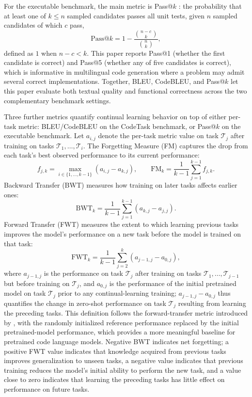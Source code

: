 For the executable benchmark, the main metric is Pass@$k$ \citep{chen2021evaluating}: the probability that at least one of $k\leq n$ sampled candidates passes all unit tests, given $n$ sampled candidates of which $c$ pass,
\begin{equation}
\mathrm{Pass@}k = 1 - \frac{\binom{n-c}{k}}{\binom{n}{k}},
\label{eq:passk}
\end{equation}
defined as $1$ when $n-c<k$. This paper reports Pass@1 (whether the first candidate is correct) and Pass@5 (whether any of five candidates is correct), which is informative in multilingual code generation where a problem may admit several correct implementations. Together, BLEU, CodeBLEU, and Pass@$k$ let this paper evaluate both textual quality and functional correctness across the two complementary benchmark settings.

Three further metrics quantify continual learning behavior on top of either per-task metric: BLEU/CodeBLEU on the CodeTask benchmark, or Pass@$k$ on the executable benchmark. Let $a_{i,j}$ denote the per-task metric value on task $\mathcal{T}_j$ after training on tasks $\mathcal{T}_1,\ldots,\mathcal{T}_i$. The Forgetting Measure (FM) \citep{wang2023comprehensive} captures the drop from each task's best observed performance to its current performance:
\begin{equation}
f_{j,k} = \max_{i \in \{1,\ldots,k-1\}} (a_{i,j} - a_{k,j}), \qquad
\mathrm{FM}_k = \frac{1}{k-1}\sum_{j=1}^{k-1} f_{j,k}.
\label{eq:fm}
\end{equation}
Backward Transfer (BWT) measures how training on later tasks affects earlier ones:
\begin{equation}
\mathrm{BWT}_k = \frac{1}{k-1}\sum_{j=1}^{k-1}(a_{k,j}-a_{j,j}).
\label{eq:bwt}
\end{equation}
Forward Transfer (FWT) measures the extent to which learning previous tasks improves the model's performance on a new task before the model is trained on that task:
\begin{equation}
\mathrm{FWT}_k = \frac{1}{k-1}\sum_{j=2}^{k}\left(a_{j-1,j} - a_{0,j}\right),
\label{eq:bwt_fwt}
\end{equation}
where $a_{j-1,j}$ is the performance on task $\mathcal{T}_j$ after training on tasks $\mathcal{T}_1,\ldots,\mathcal{T}_{j-1}$ but before training on $\mathcal{T}_j$, and $a_{0,j}$ is the performance of the initial pretrained model on task $\mathcal{T}_j$ prior to any continual-learning training; $a_{j-1,j}-a_{0,j}$ thus quantifies the change in zero-shot performance on task $\mathcal{T}_j$ resulting from learning the preceding tasks. This definition follows the forward-transfer metric introduced by \citet{lopezpaz2017gem}, with the randomly initialized reference performance replaced by the initial pretrained-model performance, which provides a more meaningful baseline for pretrained code language models. Negative BWT indicates net forgetting; a positive FWT value indicates that knowledge acquired from previous tasks improves generalization to unseen tasks, a negative value indicates that previous training reduces the model's initial ability to perform the new task, and a value close to zero indicates that learning the preceding tasks has little effect on performance on future tasks.
